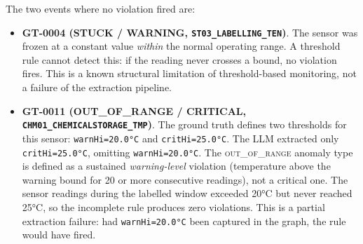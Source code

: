 ﻿\documentclass[11pt]{article}
\begin{document}
The two events where no violation fired are:
\begin{itemize}
  \item \textbf{GT-0004 (STUCK / WARNING, \texttt{ST03\_LABELLING\_TEN})}.
        The sensor was frozen at a constant value \emph{within} the normal
        operating range.  A threshold rule cannot detect this: if the reading
        never crosses a bound, no violation fires.
        This is a known structural limitation of threshold-based monitoring,
        not a failure of the extraction pipeline.

  \item \textbf{GT-0011 (OUT\_OF\_RANGE / CRITICAL,
        \texttt{CHM01\_CHEMICALSTORAGE\_TMP})}.
        The ground truth defines two thresholds for this sensor:
        \texttt{warnHi=20.0°C} and \texttt{critHi=25.0°C}.
        The LLM extracted only \texttt{critHi=25.0°C}, omitting
        \texttt{warnHi=20.0°C}.
        The \textsc{out\_of\_range} anomaly type is defined as a sustained
        \emph{warning-level} violation (temperature above the warning bound
        for 20 or more consecutive readings), not a critical one.
        The sensor readings during the labelled window exceeded 20°C but never
        reached 25°C, so the incomplete rule produces zero violations.
        This is a partial extraction failure: had \texttt{warnHi=20.0°C} been
        captured in the graph, the rule would have fired.
\end{itemize}
\end{document}
